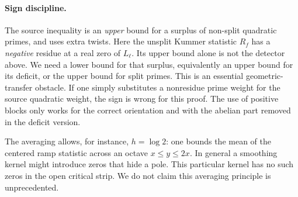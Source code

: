 \documentclass[11pt,letterpaper]{article}
\theoremstyle{definition}\newtheorem{definition}[theorem]{Definition}
\theoremstyle{remark}\newtheorem{remark}[theorem]{Remark}
\begin{document}
\paragraph{Sign discipline.} The source inequality is an \emph{upper} bound for a surplus of non-split quadratic primes, and uses extra twists. Here the unsplit Kummer statistic $R_f$ has a \emph{negative} residue at a real zero of $L_\ell$. Its upper bound alone is not the detector above. We need a lower bound for that surplus, equivalently an upper bound for its deficit, or the upper bound for split primes. This is an essential geometric-transfer obstacle. If one simply substitutes a nonresidue prime weight for the source quadratic weight, the sign is wrong for this proof. The use of positive blocks only works for the correct orientation and with the abelian part removed in the deficit version.

The averaging allows, for instance, $h=\log2$: one bounds the mean of the centered ramp statistic across an octave $x\le y\le2x$. In general a smoothing kernel might introduce zeros that hide a pole. This particular kernel has no such zeros in the open critical strip. We do not claim this averaging principle is unprecedented.
\end{document}
